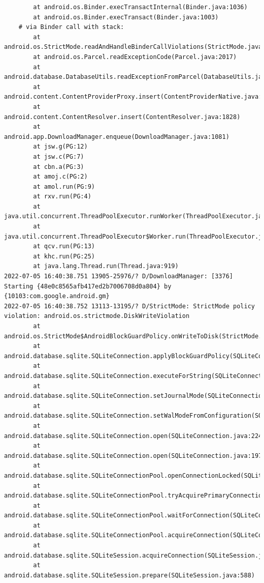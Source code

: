 \documentclass[a4paper,12pt]{book}
\begin{document}
\begin{lstlisting}
        at android.os.Binder.execTransactInternal(Binder.java:1036)
        at android.os.Binder.execTransact(Binder.java:1003)
    # via Binder call with stack:
        at android.os.StrictMode.readAndHandleBinderCallViolations(StrictMode.java:2289)
        at android.os.Parcel.readExceptionCode(Parcel.java:2017)
        at android.database.DatabaseUtils.readExceptionFromParcel(DatabaseUtils.java:137)
        at android.content.ContentProviderProxy.insert(ContentProviderNative.java:481)
        at android.content.ContentResolver.insert(ContentResolver.java:1828)
        at android.app.DownloadManager.enqueue(DownloadManager.java:1081)
        at jsw.g(PG:12)
        at jsw.c(PG:7)
        at cbn.a(PG:3)
        at amoj.c(PG:2)
        at amol.run(PG:9)
        at rxv.run(PG:4)
        at java.util.concurrent.ThreadPoolExecutor.runWorker(ThreadPoolExecutor.java:1167)
        at java.util.concurrent.ThreadPoolExecutor$Worker.run(ThreadPoolExecutor.java:641)
        at qcv.run(PG:13)
        at khc.run(PG:25)
        at java.lang.Thread.run(Thread.java:919)
2022-07-05 16:40:38.751 13905-25976/? D/DownloadManager: [3376] Starting {48e0c8565afb417ed2b7006708d0a804} by {10103:com.google.android.gm}
2022-07-05 16:40:38.752 13113-13195/? D/StrictMode: StrictMode policy violation: android.os.strictmode.DiskWriteViolation
        at android.os.StrictMode$AndroidBlockGuardPolicy.onWriteToDisk(StrictMode.java:1527)
        at android.database.sqlite.SQLiteConnection.applyBlockGuardPolicy(SQLiteConnection.java:1140)
        at android.database.sqlite.SQLiteConnection.executeForString(SQLiteConnection.java:733)
        at android.database.sqlite.SQLiteConnection.setJournalMode(SQLiteConnection.java:376)
        at android.database.sqlite.SQLiteConnection.setWalModeFromConfiguration(SQLiteConnection.java:316)
        at android.database.sqlite.SQLiteConnection.open(SQLiteConnection.java:224)
        at android.database.sqlite.SQLiteConnection.open(SQLiteConnection.java:197)
        at android.database.sqlite.SQLiteConnectionPool.openConnectionLocked(SQLiteConnectionPool.java:505)
        at android.database.sqlite.SQLiteConnectionPool.tryAcquirePrimaryConnectionLocked(SQLiteConnectionPool.java:949)
        at android.database.sqlite.SQLiteConnectionPool.waitForConnection(SQLiteConnectionPool.java:699)
        at android.database.sqlite.SQLiteConnectionPool.acquireConnection(SQLiteConnectionPool.java:380)
        at android.database.sqlite.SQLiteSession.acquireConnection(SQLiteSession.java:896)
        at android.database.sqlite.SQLiteSession.prepare(SQLiteSession.java:588)

\end{lstlisting}
\end{document}
